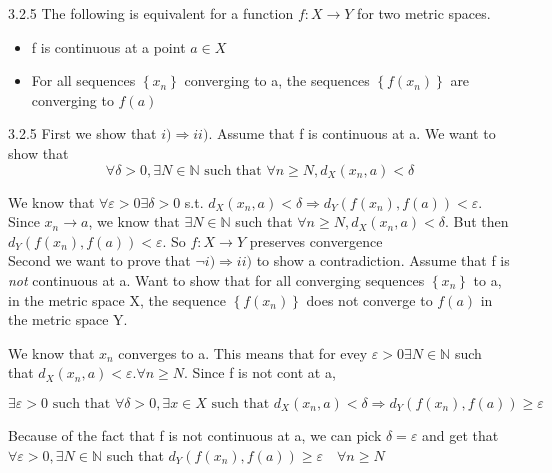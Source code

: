 \documentclass[a4paper,norsk]{article}
\renewcommand{\geq}{\geqslant}
\renewcommand{\epsilon}{\varepsilon}
\begin{document}
\begin{propositionbox}{3.2.5}{}
The following is equivalent for a function $ f: X \rightarrow Y $ for two metric spaces.

\begin{itemize}
  \item f is continuous at a point $ a \in X $ 
  \item For all sequences $ \left\{ x_n \right\}  $ converging to a, the sequences $ \left\{ f(x_n) \right\}  $ are converging to $ f(a) $  
\end{itemize}

\begin{proofbox}{3.2.5}{}
  First we show that $ i) \Rightarrow ii) $. Assume that f is continuous at a. We want to show that 
  \[
      \forall \delta > 0, \exists N \in \mathbb{N} \text{ such that } \forall n\geq N, d_X(x_n, a) < \delta
  \]
   
  We know that $ \forall \epsilon > 0 \exists \delta > 0  $ s.t. $ d_X \left( x_n, a \right) < \delta \Rightarrow d_Y \left( f(x_n), f(a) \right) < \epsilon   $. Since $ x_n \rightarrow a $, we know that $ \exists N \in \mathbb{N} $ such that $ \forall n \geq N, d_X(x_n, a) < \delta $. But then $ d_Y (f(x_n), f(a)) < \epsilon  $. So $ f:X \rightarrow Y $ preserves convergence\\

  Second we want to prove that $ \neg i) \Rightarrow ii) $ to show a contradiction. Assume that f is \textit{not} continuous at a. Want to show that for all converging sequences $ \left\{ x_n \right\}  $ to a, in the metric space X, the sequence $ \left\{ f(x_n) \right\}  $ does not converge to $ f(a) $ in the metric space Y. 

  We know that $ x_n $ converges to a. This means that for evey $ \epsilon >0 \exists N \in \mathbb{N} $ such that $ d_X(x_n, a) < \epsilon. \forall n \geq N $. Since f is not cont at a, 
  
  \[
      \exists \epsilon > 0 \text{ such that } \forall \delta > 0, \exists x \in X \text{ such that } d_X(x_n, a) < \delta \Rightarrow d_Y(f(x_n), f(a)) \geq \epsilon   
  \]

  Because of the fact that f is not continuous at a, we can pick $ \delta = \epsilon  $ and get that $ \forall \epsilon > 0, \exists N \in \mathbb{N} $ such that $ d_Y(f(x_n), f(a)) \geq \epsilon  \quad \forall n \geq N$ 
  
\end{proofbox}
\end{propositionbox}
\end{document}
